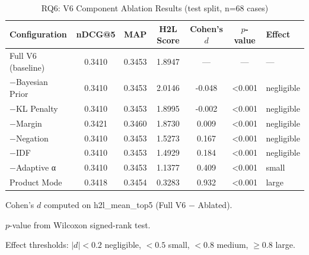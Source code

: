 \begin{table}[htbp]
  \centering
  \caption{RQ6: V6 Component Ablation Results (test split, n=68 cases)}
  \label{tab:rq6_ablation}
  \begin{tabular}{lcccccl}
    \toprule
    Configuration & nDCG@5 & MAP & H2L Score & Cohen's $d$ & $p$-value & Effect \\
    \midrule
    Full V6 (baseline) & 0.3410 & 0.3453 & 1.8947 & — & — & — \\
    −Bayesian Prior & 0.3410 & 0.3453 & 2.0146 & -0.048 & <0.001 & negligible \\
    −KL Penalty & 0.3410 & 0.3453 & 1.8995 & -0.002 & <0.001 & negligible \\
    −Margin & 0.3421 & 0.3460 & 1.8730 & 0.009 & <0.001 & negligible \\
    −Negation & 0.3410 & 0.3453 & 1.5273 & 0.167 & <0.001 & negligible \\
    −IDF & 0.3410 & 0.3453 & 1.4929 & 0.184 & <0.001 & negligible \\
    −Adaptive α & 0.3410 & 0.3453 & 1.1377 & 0.409 & <0.001 & small \\
    Product Mode & 0.3418 & 0.3454 & 0.3283 & 0.932 & <0.001 & large \\
    \bottomrule
  \end{tabular}
  \begin{tablenotes}\small
    \item Cohen's $d$ computed on h2l\_mean\_top5 (Full V6 $-$ Ablated).
    \item $p$-value from Wilcoxon signed-rank test.
    \item Effect thresholds: $|d|<0.2$ negligible, $<0.5$ small, $<0.8$ medium, $\geq0.8$ large.
  \end{tablenotes}
\end{table}
